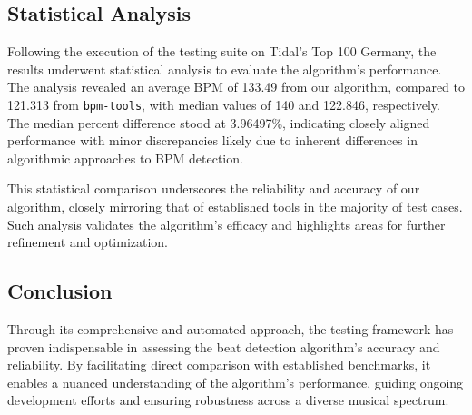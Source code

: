 \subsection{Statistical Analysis}

Following the execution of the testing suite on Tidal's Top 100 Germany, the results underwent statistical analysis to evaluate the algorithm's performance. The analysis revealed an average BPM of 133.49 from our algorithm, compared to 121.313 from \texttt{bpm-tools}, with median values of 140 and 122.846, respectively. The median percent difference stood at 3.96497\%, indicating closely aligned performance with minor discrepancies likely due to inherent differences in algorithmic approaches to BPM detection.

This statistical comparison underscores the reliability and accuracy of our algorithm, closely mirroring that of established tools in the majority of test cases. Such analysis validates the algorithm's efficacy and highlights areas for further refinement and optimization.

\subsection{Conclusion}

Through its comprehensive and automated approach, the testing framework has proven indispensable in assessing the beat detection algorithm's accuracy and reliability. By facilitating direct comparison with established benchmarks, it enables a nuanced understanding of the algorithm's performance, guiding ongoing development efforts and ensuring robustness across a diverse musical spectrum.
